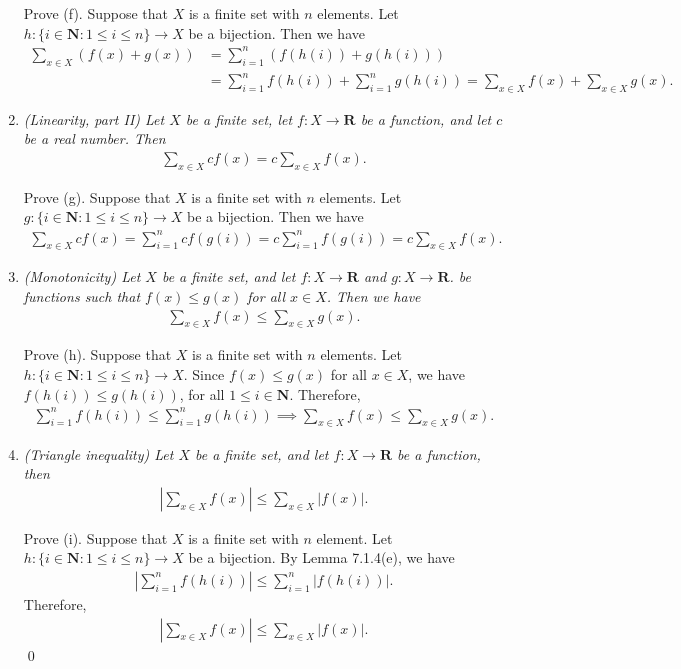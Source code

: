 \documentclass{book}
\begin{document}
\begin{enumerate}
    Prove (f). Suppose that $X$ is a finite set with $n$ elements. Let $h:\{i\in\mathbf{N}:1\leq i\leq n\}\to X$ be a bijection. Then we have
    \begin{align*}
        \sum_{x\in X}(f(x)+g(x))&=\sum_{i=1}^{n}(f(h(i))+g(h(i)))\\
        &=\sum_{i=1}^{n}f(h(i))+\sum_{i=1}^{n}g(h(i))
        =\sum_{x\in X}f(x)+\sum_{x\in X}g(x).
    \end{align*}

    \item \emph{(Linearity, part I\!I) Let $X$ be a finite set, let $f:X\to\mathbf{R}$ be a function, and let $c$ be a real number. Then}
    \begin{align*}
        \sum_{x\in X}cf(x)=c\sum_{x\in X}f(x).
    \end{align*}

    Prove (g). Suppose that $X$ is a finite set with $n$ elements. Let $g:\{i\in\mathbf{N}:1\leq i\leq n\}\to X$ be a bijection. Then we have
    \begin{align*}
        \sum_{x\in X}cf(x)=\sum_{i=1}^{n}cf(g(i))
        =c\sum_{i=1}^{n}f(g(i))
        =c\sum_{x\in X}f(x).
    \end{align*}

    \item \emph{(Monotonicity) Let $X$ be a finite set, and let $f:X\to\mathbf{R}$ and $g:X\to\mathbf{R}$. be functions such that $f(x)\leq g(x)$ for all $x\in X$. Then we have}
    \begin{align*}
        \sum_{x\in X}f(x)\leq\sum_{x\in X}g(x).
    \end{align*}

    Prove (h). Suppose that $X$ is a finite set with $n$ elements. Let $h:\{i\in\mathbf{N}:1\leq i\leq n\}\to X$. Since $f(x)\leq g(x)$ for all $x\in X$, we have $f(h(i))\leq g(h(i))$, for all $1\leq i\in\mathbf{N}$. Therefore,
    \begin{align*}
        \sum_{i=1}^{n}f(h(i))\leq\sum_{i=1}^{n}g(h(i))\implies\sum_{x\in X}f(x)\leq\sum_{x\in X}g(x).
    \end{align*}

    \item \emph{(Triangle inequality) Let $X$ be a finite set, and let $f:X\to\mathbf{R}$ be a function, then}
    \begin{align*}
        \left|\sum_{x\in X}f(x)\right|\leq\sum_{x\in X}|f(x)|.
    \end{align*}

    Prove (i). Suppose that $X$ is a finite set with $n$ element. Let $h:\{i\in\mathbf{N}:1\leq i\leq n\}\to X$ be a bijection. By Lemma 7.1.4(e), we have
    \begin{align*}
        \left|\sum_{i=1}^{n}f(h(i))\right|\leq\sum_{i=1}^{n}|f(h(i))|.
    \end{align*}
    Therefore,
    \begin{align*}
        \left|\sum_{x\in X}f(x)\right|\leq\sum_{x\in X}|f(x)|.
    \end{align*}\qed
\end{enumerate}
\end{document}
